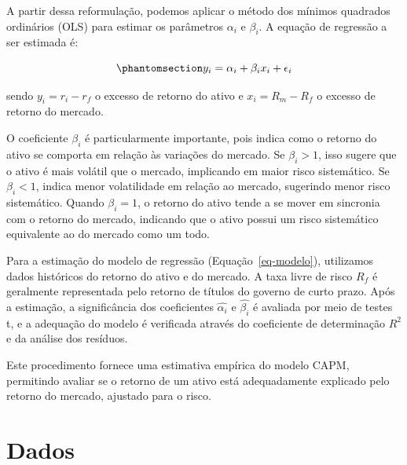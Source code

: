 \documentclass[
  12pt,
  a4paperpaper,
]{article}
\begin{document}
A partir dessa reformulação, podemos aplicar o método dos mínimos
quadrados ordinários (OLS) para estimar os parâmetros \(\alpha_i\) e
\(\beta_i\). A equação de regressão a ser estimada é:

\begin{equation}\phantomsection\label{eq-modelo}{
y_i = \alpha_i + \beta_i x_i + \epsilon_i
}\end{equation}

sendo \(y_i = r_i - r_f\) o excesso de retorno do ativo e
\(x_i = R_m - R_f\) o excesso de retorno do mercado.

O coeficiente \(\beta_i\) é particularmente importante, pois indica como
o retorno do ativo se comporta em relação às variações do mercado. Se
\(\beta_i > 1\), isso sugere que o ativo é mais volátil que o mercado,
implicando em maior risco sistemático. Se \(\beta_i < 1\), indica menor
volatilidade em relação ao mercado, sugerindo menor risco sistemático.
Quando \(\beta_i = 1\), o retorno do ativo tende a se mover em sincronia
com o retorno do mercado, indicando que o ativo possui um risco
sistemático equivalente ao do mercado como um todo.

Para a estimação do modelo de regressão (Equação~\ref{eq-modelo}),
utilizamos dados históricos do retorno do ativo e do mercado. A taxa
livre de risco \(R_f\) é geralmente representada pelo retorno de títulos
do governo de curto prazo. Após a estimação, a significância dos
coeficientes \(\hat{\alpha_i}\) e \(\hat{\beta_i}\) é avaliada por meio
de testes t, e a adequação do modelo é verificada através do coeficiente
de determinação \(R^2\) e da análise dos resíduos.

Este procedimento fornece uma estimativa empírica do modelo CAPM,
permitindo avaliar se o retorno de um ativo está adequadamente explicado
pelo retorno do mercado, ajustado para o risco.

\section{Dados}\label{sec-dados}
\end{document}
